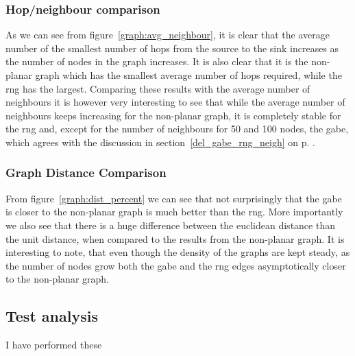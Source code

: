 \subsubsection{Hop/neighbour comparison}
\label{section:hop_neighbour_comparison}

As we can see from figure~\ref{graph:avg_neighbour}, it is clear that the average number of the smallest number of hops from the source to the sink increases as the number of nodes in the graph increases. It is also clear that it is the non-planar graph which has the smallest average number of hops required, while the \ac{rng} has the largest. Comparing these results with the average number of neighbours it is however very interesting to see that while the average number of neighbours keeps increasing for the non-planar graph, it is completely stable for the \ac{rng} and, except for the number of neighbours for 50 and 100 nodes, the \ac{gabe}, which agrees with the discussion in section~\ref{del_gabe_rng_neigh} on p. \pageref{del_gabe_rng_neigh}. 

\subsubsection{Graph Distance Comparison}
\label{section:graph_distance_comparison}


From figure~\ref{graph:dist_percent} we can see that not surprisingly that the \ac{gabe} is closer to the non-planar graph is much better than the \ac{rng}. More importantly we also see that there is a huge difference between the euclidean distance than the unit distance, when compared to the results from the non-planar graph. It is interesting to note, that even though the density of the graphs are kept steady, as the number of nodes grow both the \ac{gabe} and the \ac{rng} edges asymptotically closer to the non-planar graph. 

\subsection{}







\subsection{Test analysis}


I have performed these


\subsection{}
\label{section:test_results_spanners}
